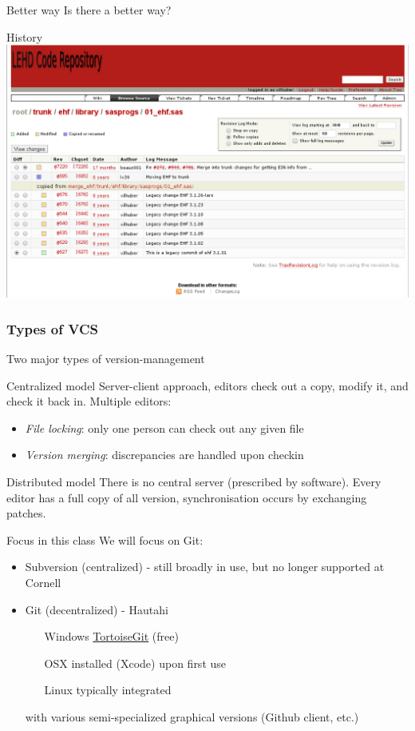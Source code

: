 \documentclass[xcolor=table,compress]{beamer}
\begin{document}
\begin{frame}{Better way}
Is there a better way?
\end{frame}


\begin{frame}{History}
\includegraphics[width=.9\textwidth]{trac-svn-view2.png}
\end{frame}


\subsubsection[Types]{Types of VCS}
\begin{frame}{Two major types of version-management}
\begin{block}{Centralized model}
Server-client approach, editors check out a copy, modify it, and check it back in. Multiple editors:
\begin{itemize}
\item \textit{File locking}: only one person can check out any given file
\item \textit{Version merging}: discrepancies are handled upon checkin
\end{itemize}
\end{block}
\pause
\begin{block}{Distributed model}
There is no central server (prescribed by software). Every editor has a full copy of all version, synchronisation occurs by exchanging patches.
\end{block}
\end{frame}


\begin{frame}{Focus in this class}
We will focus on Git:
\begin{itemize}
\item Subversion (centralized) - still broadly in use, but no longer supported at Cornell 
\item Git (decentralized) - Hautahi
\begin{itemize}
	\item[Windows] \href{http://tortoisegit.org/}{TortoiseGit} (free)
	\item[OSX] installed (Xcode) upon first use
	\item[Linux] typically integrated
\end{itemize}
with various semi-specialized graphical versions (Github client, etc.)
\end{itemize}
\end{frame}
\end{document}
